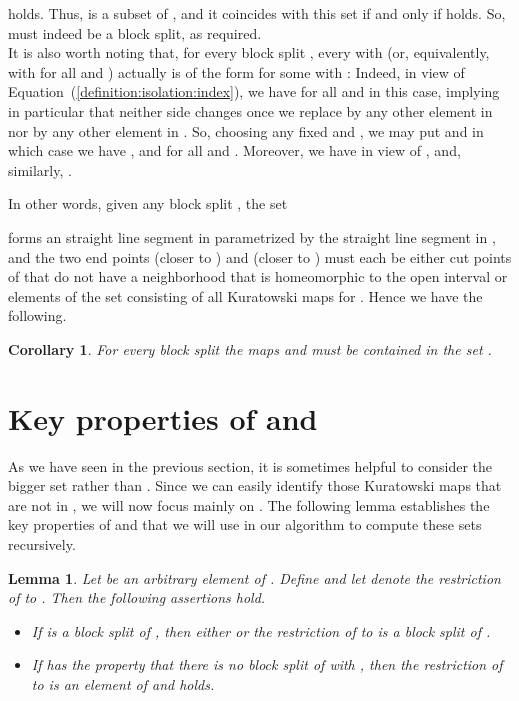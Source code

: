 \documentclass[12pt]{article}
\newtheorem{lemma}[prop]{Lemma}
\newtheorem{cor}[prop]{Corollary}
\begin{document}
 holds. Thus,  is a subset of , and it coincides with this set if and only if  holds. 
So,  must indeed be a block split, as required.
\hfill\\
 
It is also worth noting that, for every block split , every 
 with  (or, 
equivalently, with  for all  and  ) actually is of the 
form  for some 
 with : Indeed, 
in view of Equation~(\ref{definition:isolation:index}),
we have  for 
all   and  in this case, implying in particular that neither side 
changes once we replace  by any other element in  nor  by any other element 
in . So, choosing any fixed  and , we may put 
 and  in which case we have
 , 
 and  for all  and  .
Moreover, we have  in view of 
,
and, similarly, . 

In other words, given any block split , the set 

forms an straight line segment in  parametrized by the straight line segment
 in , and the two end points 
 (closer to ) and 
 (closer to ) must each be either cut points of  that do not have a
neighborhood that is homeomorphic to the open interval 
 or elements of the set  consisting of all Kuratowski maps 
for . Hence we have the following.

\begin{cor}
\label{corollary:endpoints:bridges}
For every block split  the maps 
 and  must be contained in the set 
. 
\end{cor}

\section{Key properties of  and }
\label{section:key:properties}


As we have seen in the previous section, it is sometimes helpful to consider
the bigger set  rather than . Since we can easily identify
those Kuratowski maps that are not in , 
we will now focus mainly on . The following lemma establishes the 
key properties of  and  that we will use in our algorithm 
to compute these sets recursively.

\begin{lemma}
\label{lemma:recursive:approach}
Let  be an arbitrary element of . 
Define 
and let  denote the restriction of  to .
Then the following assertions hold.
\begin{itemize}
\item[(i)]
If  is a block split of , then either  or 
the restriction  of  to  is a block split of .
\item[(ii)]
If  has the property that there is no
block split  of  with ,
then the restriction  of  to  is an element
of  and  holds.
\end{itemize}
\end{lemma}
\end{document}
